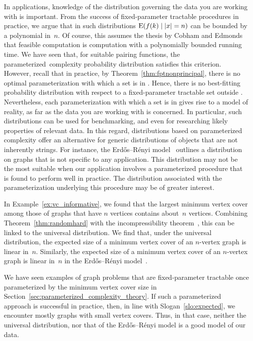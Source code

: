 In applications, knowledge of the distribution governing the data you are working with is important.
From the success of fixed-parameter tractable procedures in practice, we argue that in such distributions $\operatorname*{E}(f(k) \mid {\lvert x\rvert} = n)$ can be bounded by a polynomial in~$n$.
Of course, this assumes the thesis by Cobham and Edmonds that feasible computation is computation with a polynomially bounded running time.
We have seen that, for suitable pairing functions, the parameterized~complexity probability distribution satisfies this criterion.
However, recall that in practice, by Theorem~\ref{thm:fptnonprincipal}, there is no optimal parameterization with which a set is in .
Hence, there is no best-fitting probability distribution with respect to a fixed-parameter tractable set outside .
Nevertheless, each parameterization with which a set is in  gives rise to a model of reality, as far as the data you are working with is concerned.
In particular, such distributions can be used for benchmarking, and even for researching likely properties of relevant data.
In this regard, distributions based on parameterized complexity offer an alternative for generic distributions of objects that are not inherently strings.
For instance, the Erd{\H{o}}s--R{\'e}nyi model~\parencite{erdos1959random,gilbert1959random} outlines a distribution on graphs that is not specific to any application.
This distribution may not be the most suitable when our application involves a parameterized procedure that is found to perform well in practice.
The distribution associated with the parameterization underlying this procedure may be of greater interest.
\begin{example}
  In Example~\ref{ex:vc_informative}, we found that the largest minimum vertex cover among those of graphs that have $n$ vertices contains about~$n$ vertices.
  Combining Theorem~\ref{thm:randomhard} with the incompressibility theorem~\parencite{li2008introduction}, this can be linked to the universal distribution.
  We find that, under the universal distribution, the expected size of a minimum vertex cover of an $n$-vertex graph is linear in~$n$.
  Similarly, the expected size of a minimum vertex cover of an $n$-vertex graph is linear in~$n$ in the Erd{\H{o}}s--R{\'e}nyi model~\parencite[Theorem~23]{witteveen2015structural}.

  We have seen examples of graph problems that are fixed-parameter tractable once parameterized by the minimum vertex cover size in Section~\ref{sec:parameterized_complexity_theory}.
  If such a parameterized approach is successful in practice, then, in line with Slogan~\ref{slo:expected}, we encounter mostly graphs with small vertex covers.
  Thus, in that case, neither the universal distribution, nor that of the Erd{\H{o}}s--R{\'e}nyi model is a good model of our data.
\end{example}

